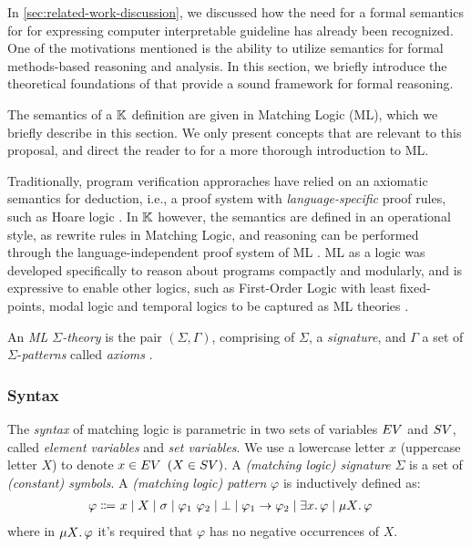 In \autoref{sec:related-work-discussion}, we discussed how
the need for a formal semantics for \DSLs{} for expressing
computer interpretable guideline has already been recognized.
One of the motivations mentioned is the ability to utilize
semantics for formal methods-based reasoning and analysis.
In this section, we briefly introduce the theoretical foundations
of \K{} that provide a sound framework for formal reasoning.

The semantics of a $\mathbb{K}$ definition are given in
Matching Logic (ML), which we briefly
describe in this section. We only present concepts that are
relevant to this proposal, and direct the reader to \cite{RosuLMCS17,ChenLICS19}
for a more thorough introduction to ML.

Traditionally, program verification approraches have
relied on an axiomatic semantics for deduction, i.e., a proof system with
\emph{language-specific} proof rules, such as Hoare logic \cite{HoareACM69}.
In $\mathbb{K}$ however, the semantics are defined in an operational style, as
rewrite rules in Matching Logic, and reasoning can be performed through
the language-independent proof system of ML \cite{MatchingLogicUrl}.
ML as a logic was developed specifically to reason about programs
compactly and modularly, and is expressive to enable other logics,
such as First-Order Logic with least fixed-points, modal logic and temporal
logics to be captured as ML theories \cite{RosuLMCS17,ChenLICS19,ChenTR20,ChenICFP20}.

An \emph{ML $\Sigma$-theory} is the pair $\left(\Sigma, \Gamma\right)$,
comprising of $\Sigma$, a \emph{signature}, and $\Gamma$ a set of
$\Sigma$-\emph{patterns} called \emph{axioms} \cite{ChenLICS19}.

\subsubsection{Syntax}

The \emph{syntax} of matching logic is parametric in two sets of variables
$EV$ and $SV$,
called \emph{element variables} and \emph{set variables}. We use
a lowercase letter $x$ (uppercase letter $X$) to denote $x \in EV$ $(X \in SV)$.
A \emph{(matching logic) signature} $\Sigma$ is a set of \emph{(constant)
  symbols}. A \emph{(matching logic) pattern} $\varphi$ is inductively defined as:
\begin{align*}
\varphi \Coloneqq\
& x
\mid X
\mid \sigma
\mid \varphi_1 \  \varphi_2
\mid \bot
\mid \varphi_1 \imp \varphi_2
\mid \exists x \ld \varphi
\mid \mu X \ld \varphi %
\end{align*}
where in $\mu X \mathord{.\,} \varphi$ it's required that $\varphi$ has no negative occurrences of $X$.

